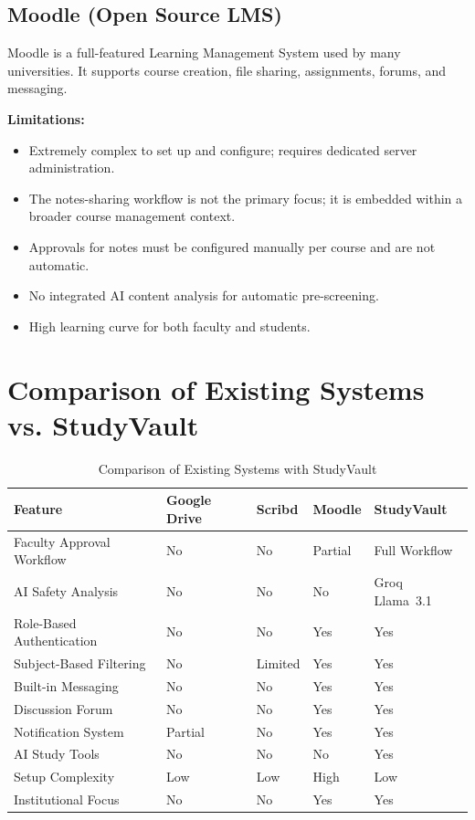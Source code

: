 \documentclass{sgcproject}
\begin{document}
\subsection{Moodle (Open Source LMS)}

Moodle is a full-featured Learning Management System used by many universities. It supports course creation, file sharing, assignments, forums, and messaging.

\textbf{Limitations:}
\begin{itemize}
    \item Extremely complex to set up and configure; requires dedicated server administration.
    \item The notes-sharing workflow is not the primary focus; it is embedded within a broader course management context.
    \item Approvals for notes must be configured manually per course and are not automatic.
    \item No integrated AI content analysis for automatic pre-screening.
    \item High learning curve for both faculty and students.
\end{itemize}

\section{Comparison of Existing Systems vs. StudyVault}

\begin{table}[H]
\centering
\begin{tabular}{|p{4cm}|p{2cm}|p{2cm}|p{2cm}|p{3cm}|}
\hline
\textbf{Feature} & \textbf{Google Drive} & \textbf{Scribd} & \textbf{Moodle} & \textbf{StudyVault} \\
\hline
Faculty Approval Workflow & No & No & Partial & Full Workflow \\
\hline
AI Safety Analysis & No & No & No & Groq Llama~3.1 \\
\hline
Role-Based Authentication & No & No & Yes & Yes \\
\hline
Subject-Based Filtering & No & Limited & Yes & Yes \\
\hline
Built-in Messaging & No & No & Yes & Yes \\
\hline
Discussion Forum & No & No & Yes & Yes \\
\hline
Notification System & Partial & No & Yes & Yes \\
\hline
AI Study Tools & No & No & No & Yes \\
\hline
Setup Complexity & Low & Low & High & Low \\
\hline
Institutional Focus & No & No & Yes & Yes \\
\hline
\end{tabular}
\caption{Comparison of Existing Systems with StudyVault}
\end{table}
\end{document}
